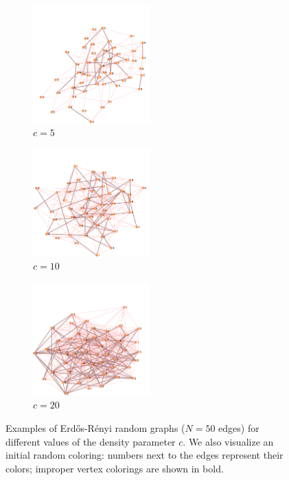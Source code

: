 \documentclass{article}
\begin{document}
  \begin{figure}[h]
      \centering
      \begin{subfigure}[t]{4.5cm}
        \centering
        \includegraphics[width=4.5cm]{figures/random-graph-50-5-5.pdf}
        \caption{$c = 5$}
      \end{subfigure}
      \quad
      \begin{subfigure}[t]{4.5cm}
        \centering
        \includegraphics[width=4.5cm]{figures/random-graph-50-10-5.pdf}
        \caption{$c = 10$}
      \end{subfigure}
      \quad
      \begin{subfigure}[t]{4.5cm}
        \centering
        \includegraphics[width=4.5cm]{figures/random-graph-50-20-5.pdf}
        \caption{$c = 20$}
      \end{subfigure}

    \caption{Examples of Erd\H{o}s-R\'{e}nyi random graphs ($N = 50$ edges) for different values of the density parameter $c$. We also visualize an initial random coloring: numbers next to the edges represent their colors; improper vertex colorings are shown in bold.}\label{Fig:random-graph-examples}
  \end{figure}
\end{document}
